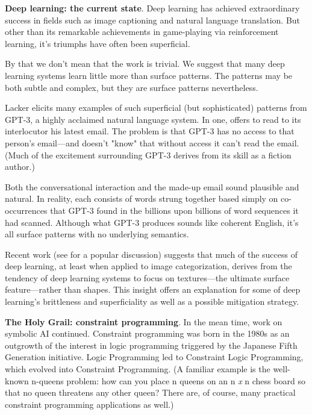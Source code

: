 \smallv\noindent\textbf{Deep learning: the current state}. Deep learning has achieved extraordinary success in fields such as image captioning and natural language translation.\cite{garnelo2019reconciling} But other than its remarkable achievements in game-playing via reinforcement learning\cite{silver2018general}, it's triumphs have often been superficial. 

By that we don't mean that the work is trivial. We suggest that many deep learning systems learn little more than surface patterns. The patterns may be both subtle and complex, but they are surface patterns nevertheless.

Lacker\cite{lacker-gpt3} elicits many examples of such superficial (but sophisticated) patterns from GPT-3\cite{brown2020language}, a highly acclaimed natural language system. In one, offers to read to its interlocutor his latest email. The problem is that GPT-3 has no access to that person's email---and doesn't "know" that without access it can't read the email. (Much of the excitement surrounding GPT-3 derives from its skill as a fiction author.) 

Both the conversational interaction and the made-up email sound plausible and natural. In reality, each consists of words strung together based simply on co-occurrences that GPT-3 found in the billions upon billions of word sequences it had scanned. Although what GPT-3 produces sounds like coherent English, it's all surface patterns with no underlying semantics.

Recent work\cite{geirhos2018imagenet} (see \cite{Cepelewicz-textures-2020} for a popular discussion) suggests that much of the success of deep learning, at least when applied to image categorization, derives from the tendency of deep learning systems to focus on textures---the ultimate surface feature---rather than shapes.  This insight offers an explanation for some of deep learning's brittleness and superficiality as well as a possible mitigation strategy.

\smallv\noindent\textbf{The Holy Grail: constraint programming}. In the mean time, work on symbolic AI continued. Constraint programming was born in the 1980s as an outgrowth of the interest in logic programming triggered by the Japanese Fifth Generation initiative.\cite{shapiro1983fifth} Logic Programming led to Constraint Logic Programming, which evolved into Constraint Programming. (A familiar example is the well-known n-queens problem: how can you place n queens on an n \textit{x} n chess board so that no queen threatens any other queen? There are, of course, many practical constraint programming applications as well.)

